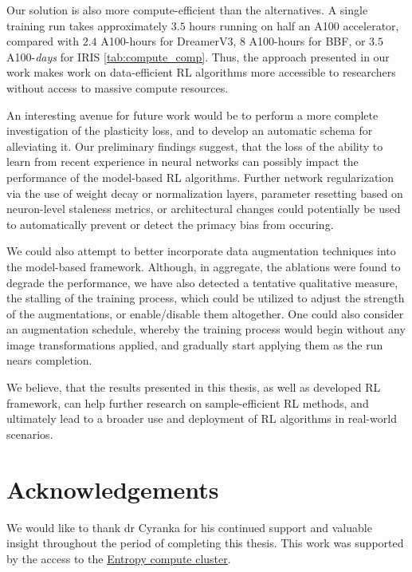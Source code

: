 \documentclass[en]{pracamgr}
\begin{document}
Our solution is also more compute-efficient than the alternatives. A single training run takes approximately $3.5$ hours running on half an A100 accelerator, compared with $2.4$ A100-hours for DreamerV3, $8$ A100-hours for BBF, or $3.5$ A100-\emph{days} for IRIS \autoref{tab:compute_comp}. Thus, the approach presented in our work makes work on data-efficient RL algorithms more accessible to researchers without access to massive compute resources.

An interesting avenue for future work would be to perform a more complete investigation of the plasticity loss, and to develop an automatic schema for alleviating it. Our preliminary findings suggest, that the loss of the ability to learn from recent experience in neural networks can possibly impact the performance of the model-based RL algorithms. Further network regularization via the use of weight decay or normalization layers, parameter resetting based on neuron-level staleness metrics, or architectural changes could potentially be used to automatically prevent or detect the primacy bias from occuring.

We could also attempt to better incorporate data augmentation techniques into the model-based framework. Although, in aggregate, the ablations were found to degrade the performance, we have also detected a tentative qualitative measure, the stalling of the training process, which could be utilized to adjust the strength of the augmentations, or enable/disable them altogether. One could also consider an augmentation schedule, whereby the training process would begin without any image transformations applied, and gradually start applying them as the run nears completion.

We believe, that the results presented in this thesis, as well as developed RL framework, can help further research on sample-efficient RL methods, and ultimately lead to a broader use and deployment of RL algorithms in real-world scenarios.

\section{Acknowledgements}

We would like to thank dr Cyranka for his continued support and valuable insight throughout the period of completing this thesis. This work was supported by the access to the \href{https://entropy-doc.mimuw.edu.pl/}{Entropy compute cluster}.

\printbibliography
\end{document}
